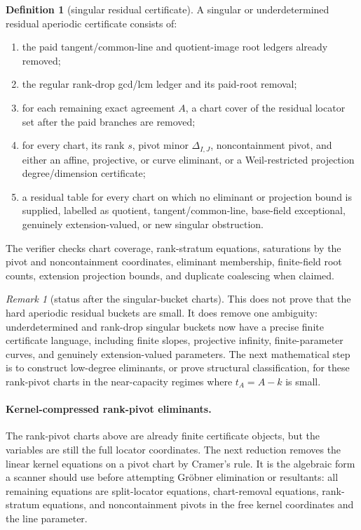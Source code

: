 \documentclass[11pt]{article}
\theoremstyle{definition}
\newtheorem{definition}[theorem]{Definition}
\theoremstyle{remark}
\newtheorem{remark}[theorem]{Remark}
\begin{document}
\begin{definition}[singular residual certificate]
\label{def:singular-residual-certificate}
A singular or underdetermined residual aperiodic certificate consists of:
\begin{enumerate}[label=\textup{(\roman*)},leftmargin=2.2em]
\item the paid tangent/common-line and quotient-image root ledgers already
removed;
\item the regular rank-drop gcd/lcm ledger and its paid-root removal;
\item for each remaining exact agreement $A$, a chart cover of the residual
locator set after the paid branches are removed;
\item for every chart, its rank $s$, pivot minor $\Delta_{I,J}$, noncontainment
pivot, and either an affine, projective, or curve eliminant, or a
Weil-restricted projection degree/dimension certificate;
\item a residual table for every chart on which no eliminant or projection bound
is supplied, labelled as quotient, tangent/common-line, base-field exceptional,
genuinely extension-valued, or new singular obstruction.
\end{enumerate}
The verifier checks chart coverage, rank-stratum equations, saturations by the
pivot and noncontainment coordinates, eliminant membership, finite-field root
counts, extension projection bounds, and duplicate coalescing when claimed.
\end{definition}

\begin{remark}[status after the singular-bucket charts]
\label{rem:singular-bucket-chart-status}
This does not prove that the hard aperiodic residual buckets are small.  It does remove
one ambiguity: underdetermined and rank-drop singular buckets now have a precise
finite certificate language, including finite slopes, projective infinity,
finite-parameter curves, and genuinely extension-valued parameters.  The next
mathematical step is to construct low-degree eliminants, or prove structural
classification, for these rank-pivot charts in the near-capacity regimes where
$t_A=A-k$ is small.
\end{remark}


\paragraph{Kernel-compressed rank-pivot eliminants.}
The rank-pivot charts above are already finite certificate objects, but the
variables are still the full locator coordinates.  The next reduction removes the
linear kernel equations on a pivot chart by Cramer's rule.  It is the algebraic
form a scanner should use before attempting Gr\"obner elimination or resultants:
all remaining equations are split-locator equations, chart-removal equations,
rank-stratum equations, and noncontainment pivots in the free kernel coordinates
and the line parameter.
\end{document}
